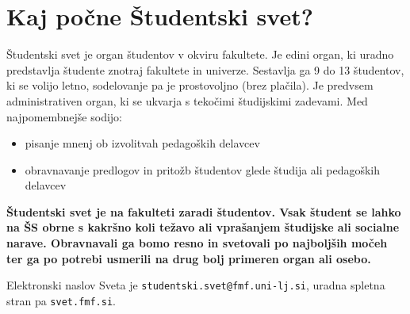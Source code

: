 \documentclass[a4paper,oneside,12pt]{article}
\title{\Title}
\author{\Author}
\date{\today}
\theoremstyle{definition}
\begin{document}

\section*{Kaj počne Študentski svet?}

Študentski svet je organ študentov v okviru fakultete. Je edini organ, ki uradno predstavlja
študente znotraj fakultete in univerze. Sestavlja ga 9 do 13 študentov, ki se volijo letno,
sodelovanje pa je prostovoljno (brez plačila). Je predvsem administrativen organ, ki se ukvarja s
tekočimi študijskimi zadevami. Med najpomembnejše sodijo:
\begin{itemize}
  \item pisanje mnenj ob izvolitvah pedagoških delavcev
  \item obravnavanje predlogov in pritožb študentov glede študija ali pedagoških delavcev
\end{itemize}

\textbf{Študentski svet je na fakulteti zaradi študentov. Vsak študent se lahko na ŠS obrne s
kakršno koli težavo ali vprašanjem študijske ali socialne narave. Obravnavali ga bomo resno in
svetovali po najboljših močeh ter ga po potrebi usmerili na drug bolj primeren organ ali osebo.}

Elektronski naslov Sveta je \texttt{studentski.svet@fmf.uni-lj.si}, uradna spletna stran pa
\texttt{svet.fmf.si}.
\end{document}
